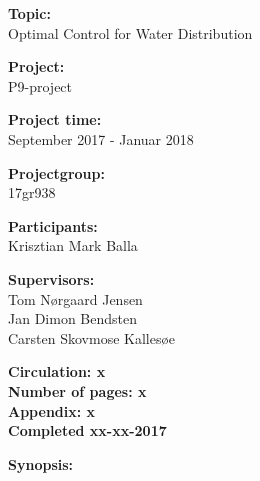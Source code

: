 \begin{minipage}[t]{0.48\textwidth}
\textbf{Topic:} \\[5pt]\bigskip\hspace{2ex}
Optimal Control for Water Distribution

\textbf{Project:} \\[5pt]\bigskip\hspace{2ex}
P9-project

\textbf{Project time:} \\[5pt]\bigskip\hspace{2ex}
September 2017 - Januar 2018

\textbf{Projectgroup:} \\[5pt]\bigskip\hspace{2ex}
17gr938	

\textbf{Participants:} \\[5pt]\hspace*{2ex}
Krisztian Mark Balla \\\hspace*{2ex}

\textbf{Supervisors:} \\[5pt]\hspace*{2ex}
Tom Nørgaard Jensen \\\hspace*{2ex}
Jan Dimon Bendsten \\\hspace*{2ex}
Carsten Skovmose Kallesøe \\\bigskip\hspace{2ex}

\vspace*{3.5cm}

\textbf{Circulation: x} \\
\textbf{Number of pages: x}\\
\textbf{Appendix: x } \\
\textbf{Completed xx-xx-2017}\\
\end{minipage}
\hfill
\begin{minipage}[t]{0.483\textwidth}
\textbf{Synopsis:} \\[5pt]
\fbox{\parbox{7cm}{\bigskip\bigskip}}
\end{minipage}

\vfill